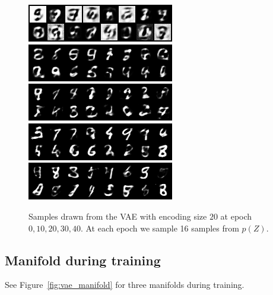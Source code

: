 \documentclass{article}
\begin{document}
\begin{figure}
  \centering
  \includegraphics{assignment_3/code/figures/vae_sample_0.png}
  \includegraphics{assignment_3/code/figures/vae_sample_10.png}
  \includegraphics{assignment_3/code/figures/vae_sample_20.png}
  \includegraphics{assignment_3/code/figures/vae_sample_30.png}
  \includegraphics{assignment_3/code/figures/vae_sample_39.png}
  \caption{Samples drawn from the VAE with encoding size \(20\) at epoch \(0,10,20,30,40\). At each epoch we sample 16 samples from \(p(Z)\).}
  \label{fig:vae_samples}
\end{figure}

\subsection{Manifold during training}
See Figure~\ref{fig:vae_manifold} for three manifolds during training.
\end{document}
